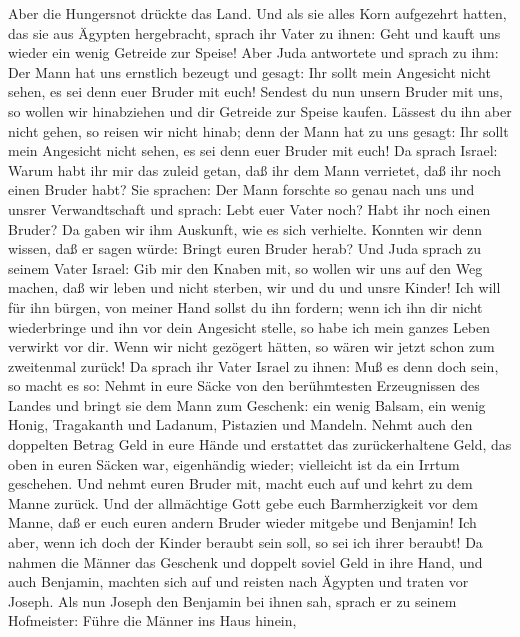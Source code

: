  Aber die Hungersnot drückte das Land.  Und
als sie alles Korn aufgezehrt hatten, das sie aus Ägypten hergebracht,
sprach ihr Vater zu ihnen: Geht und kauft uns wieder ein wenig Getreide
zur Speise!  Aber Juda antwortete und sprach zu ihm: Der
Mann hat uns ernstlich bezeugt und gesagt: Ihr sollt mein Angesicht
nicht sehen, es sei denn euer Bruder mit euch!  Sendest du
nun unsern Bruder mit uns, so wollen wir hinabziehen und dir Getreide
zur Speise kaufen.  Lässest du ihn aber nicht gehen, so
reisen wir nicht hinab; denn der Mann hat zu uns gesagt: Ihr sollt mein
Angesicht nicht sehen, es sei denn euer Bruder mit euch! 
Da sprach Israel: Warum habt ihr mir das zuleid getan, daß ihr dem Mann
verrietet, daß ihr noch einen Bruder habt?  Sie sprachen:
Der Mann forschte so genau nach uns und unsrer Verwandtschaft und
sprach: Lebt euer Vater noch? Habt ihr noch einen Bruder? Da gaben wir
ihm Auskunft, wie es sich verhielte. Konnten wir denn wissen, daß er
sagen würde: Bringt euren Bruder herab?  Und Juda sprach
zu seinem Vater Israel: Gib mir den Knaben mit, so wollen wir uns auf
den Weg machen, daß wir leben und nicht sterben, wir und du und unsre
Kinder!  Ich will für ihn bürgen, von meiner Hand sollst
du ihn fordern; wenn ich ihn dir nicht wiederbringe und ihn vor dein
Angesicht stelle, so habe ich mein ganzes Leben verwirkt vor dir.
 Wenn wir nicht gezögert hätten, so wären wir jetzt schon
zum zweitenmal zurück!  Da sprach ihr Vater Israel zu
ihnen: Muß es denn doch sein, so macht es so: Nehmt in eure Säcke von
den berühmtesten Erzeugnissen des Landes und bringt sie dem Mann zum
Geschenk: ein wenig Balsam, ein wenig Honig, Tragakanth und Ladanum,
Pistazien und Mandeln.  Nehmt auch den doppelten Betrag
Geld in eure Hände und erstattet das zurückerhaltene Geld, das oben in
euren Säcken war, eigenhändig wieder; vielleicht ist da ein Irrtum
geschehen.  Und nehmt euren Bruder mit, macht euch auf
und kehrt zu dem Manne zurück.  Und der allmächtige Gott
gebe euch Barmherzigkeit vor dem Manne, daß er euch euren andern Bruder
wieder mitgebe und Benjamin! Ich aber, wenn ich doch der Kinder beraubt
sein soll, so sei ich ihrer beraubt!  Da nahmen die
Männer das Geschenk und doppelt soviel Geld in ihre Hand, und auch
Benjamin, machten sich auf und reisten nach Ägypten und traten vor
Joseph.  Als nun Joseph den Benjamin bei ihnen sah,
sprach er zu seinem Hofmeister: Führe die Männer ins Haus hinein,
